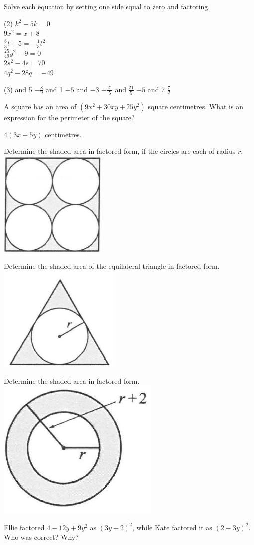 \documentclass[12pt,fleqn]{book}
\newcommand{\prb}[1]{\begin{Exercise}#1\end{Exercise}}
\newcommand{\sol}[1]{\begin{Answer}#1\end{Answer}}
\begin{document}
\prb{Solve each equation by setting one side equal to zero and factoring.
	\begin{tasks}(2)
		\task $k^2-5 k=0$
		\\[5em]
		\task $9 x^2=x+8$
		\\[5em]
		\task $\frac{8}{3} t+5=-\frac{1}{3} t^2$
		\\[5em]
		\task $\frac{25}{49} y^2-9=0$
		\\[5em]
		\task $2 s^2-4 s=70$
		\\[5em]
		\task $4 q^2-28 q=-49$
		\\[5em]
	\end{tasks}
}
\sol{
	\begin{tasks}(3)
		 and 5
		\task $-\frac{8}{9}$ and 1
		\task $-5$ and $-3$
		\task $-\frac{21}{5}$ and $\frac{21}{5}$
		\task $-5$ and 7
		\task $\frac{7}{2}$
	\end{tasks}
}
\prb{A square has an area of $\left(9 x^2+30 x y+25 y^2\right)$ square centimetres. What is an expression for the perimeter of the square?\\[5em]}
\sol{$4(3x + 5y)$ centimetres.}
\prb{Determine the shaded area in factored form, if the circles are each of radius $r$.
    \\
  \includegraphics[height=2in]{figures/circlesinsquare.png}
}
\prb{Determine the shaded area of the equilateral triangle in factored form.
\\
  \includegraphics[height=2in]{figures/circleintriangle.png}
}
\prb{Determine the shaded area in factored form.
\\
  \includegraphics[height=2in\textwidth]{figures/circle-in-circle.png}
}
\prb{Ellie factored $4-12 y+9 y^2$ as $(3 y-2)^2$, while Kate factored it as $(2-3 y)^2$. Who was correct? Why?}
\end{document}
